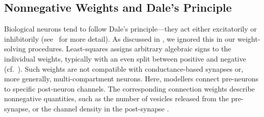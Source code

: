 
\subsection{Nonnegative Weights and Dale's Principle}
\label{sec:nef_nonneg}

Biological neurons tend to follow Dale's principle---they act either excitatorily or inhibitorily (see~ for more detail).
As discussed in , we ignored this in our weight-solving procedures.
Least-squares assigns arbitrary algebraic signs to the individual weights, typically with an even split between positive and negative (cf.~).
Such weights are not compatible with conductance-based synapses or, more generally, multi-compartment neurons.
Here, modellers connect pre-neurons to specific post-neuron channels.
The corresponding connection weights describe nonnegative quantities, such as the number of vesicles released from the pre-synapse, or the channel density in the post-synapse \citep{roth2009modeling}.


